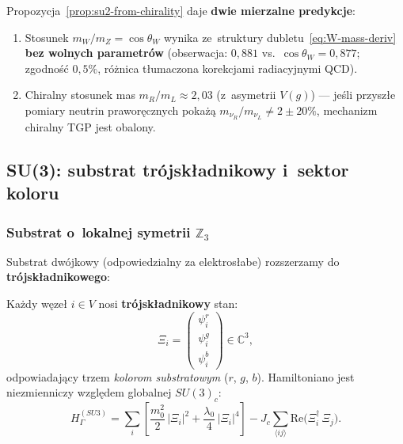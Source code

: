 \begin{remark}%
\label{rem:su2-falsify}
Propozycja~\ref{prop:su2-from-chirality} daje
\textbf{dwie mierzalne predykcje}:
\begin{enumerate}[nosep]
  \item Stosunek $m_W/m_Z = \cos\theta_W$ wynika ze~struktury
    dubletu~\eqref{eq:W-mass-deriv} \textbf{bez wolnych parametr\'ow}
    (obserwacja: $0{,}881$ vs.~$\cos\theta_W = 0{,}877$; zgodno\'s\'c $0{,}5\%$,
    r\'o\.znica tłumaczona korekcjami radiacyjnymi QCD).
  \item Chiralny stosunek mas $m_R/m_L \approx 2{,}03$ (z~asymetrii $V(g)$)
    --- je\'sli przysz\l{}e pomiary neutrin prawor\k{e}cznych
    poka\.z\k{a} $m_{\nu_R}/m_{\nu_L} \neq 2 \pm 20\%$,
    mechanizm chiralny TGP jest obalony.
\end{enumerate}
\end{remark}

\subsection{SU(3): substrat trójskładnikowy i~sektor koloru}%
\label{ssec:su3-color}

\subsubsection{Substrat o~lokalnej symetrii $\mathbb{Z}_3$}

Substrat dwój\-kowy (odpowiedzialny za elektrosłabe) rozszerzamy
do \textbf{trójskładnikowego}:

\begin{axiom}\label{ax:color-substrate}
Każdy węzeł $i \in V$ nosi \textbf{trójskładnikowy} stan:
\begin{equation}\label{eq:triplet-state}
    \Xi_i = \begin{pmatrix} \psi_i^r \\ \psi_i^g \\ \psi_i^b \end{pmatrix}
    \in \mathbb{C}^3,
\end{equation}
odpowiadający trzem \emph{kolorom substratowym}
($r$, $g$, $b$). Hamiltoniano jest niezmienniczy względem globalnej
$SU(3)_c$:
\begin{equation}\label{eq:H-color}
    H_\Gamma^{(SU3)} = \sum_i \left[
        \frac{m_0^2}{2}\,|\Xi_i|^2
        + \frac{\lambda_0}{4}\,|\Xi_i|^4
    \right]
    - J_c\sum_{\langle ij\rangle} \mathrm{Re}
      \bigl(\Xi_i^\dagger\,\Xi_j\bigr).
\end{equation}
\end{axiom}

